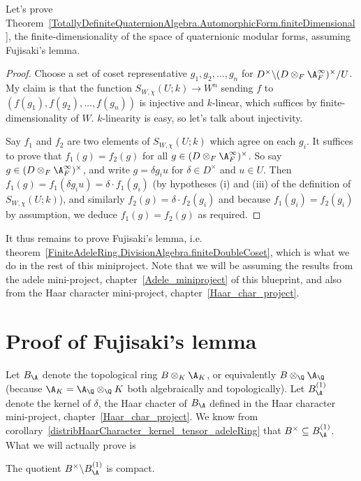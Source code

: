 Let's prove Theorem~\ref{TotallyDefiniteQuaternionAlgebra.AutomorphicForm.finiteDimensional},
the finite-dimensionality of the space of quaternionic modular forms,
assuming Fujisaki's lemma.
\begin{proof}
  Choose a set of coset representative $g_1,g_2,\ldots,g_n$ for
  $D^\times\backslash(D\otimes_F\A_F^\infty)^\times/U$. My claim is that
  the function $S_{W,\chi}(U;k)\to W^n$ sending $f$ to $(f(g_1),f(g_2),\ldots,f(g_n))$
  is injective and $k$-linear, which suffices by finite-dimensionality of $W$.
  $k$-linearity is easy, so let's talk about injectivity.

  Say $f_1$ and $f_2$ are two elements of $S_{W,\chi}(U;k)$ which agree on
  each $g_i$. It suffices to prove that $f_1(g)=f_2(g)$ for all
  $g\in(D\otimes_F\A_F^\infty)^\times$. So say $g\in(D\otimes_F\A_F^\infty)^\times$,
  and write $g=\delta g_iu$ for $\delta \in D^\times$ and $u\in U$.
  Then $f_1(g)=f_1(\delta g_iu)=\delta\cdot f_1(g_i)$ (by hypotheses (i) and (iii)
  of the definition of $S_{W,\chi}(U;k)$), and similarly $f_2(g)=\delta\cdot f_2(g_i)$
  and because $f_1(g_i)=f_2(g_i)$ by assumption, we deduce $f_1(g)=f_2(g)$ as required.
\end{proof}

It thus remains to prove Fujisaki's lemma, i.e. theorem~\ref{FiniteAdeleRing.DivisionAlgebra.finiteDoubleCoset},
which is what we do in the rest of this
miniproject. Note that we will be assuming the results
from the adele mini-project, chapter~\ref{Adele_miniproject} of this blueprint,
and also from the Haar character mini-project, chapter~\ref{Haar_char_project}.

\section{Proof of Fujisaki's lemma}

Let $B_{\A}$ denote the topological ring $B\otimes_K\A_K$, or equivalently $B\otimes_{\Q}\A_{\Q}$
(because $\A_K=\A_{\Q}\otimes_{\Q}K$ both algebraically and topologically). Let $B_{\A}^{(1)}$
denote the kernel of $\delta$, the Haar chacter of $B_{\A}$ defined in the Haar character
mini-project, chapter~\ref{Haar_char_project}. We know from
corollary~\ref{distribHaarCharacter_kernel_tensor_adeleRing} that $B^\times\subseteq B_{\A}^{(1)}$.
What we will actually prove is

\begin{theorem}
  \label{AdeleRing.DivisionAlgebra.compact_quotient} The quotient $B^\times\backslash B_{\A}^{(1)}$
  is compact.
\end{theorem}

